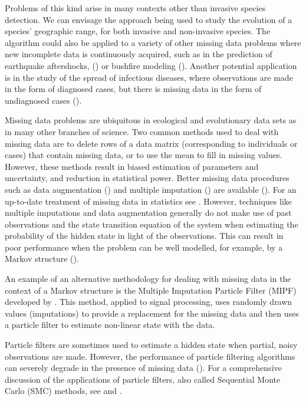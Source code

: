 Problems of this kind arise in many contexts other than invasive species detection. We can envisage the approach being used to study the evolution of a species' geographic range, for both invasive and non-invasive species. The algorithm could also be applied to a variety of other missing data problems where new incomplete data is continuously acquired, such as in the prediction of earthquake aftershocks, (\cite{Seif}) or bushfire modeling (\cite{Beer}). Another potential application is in the study of the spread of infectious diseases, where observations are made in the form of diagnosed cases, but there is missing data in the form of undiagnosed cases (\cite{O'Neill}). 

Missing data problems are ubiquitous in ecological and evolutionary data sets as in many other branches of science. Two common methods used to deal with missing data are to delete rows of a data matrix (corresponding to individuals or cases) that contain missing data, or to use the mean to fill in missing values. However, these methods result in biased estimation of parameters and uncertainty, and reduction in statistical power. Better missing data procedures such as data augmentation (\cite{Tanner}) and multiple imputation (\cite{RubinMI}) are available  (\cite{Nakagawa}).
For an up-to-date treatment of missing data in statistics see \cite{Little}.
However, techniques like multiple imputations and data augmentation generally do not make use of past observations and the state transition equation of the system when estimating the probability of the hidden state in light of the observations. This can result in poor performance when the problem can be well modelled, for example, by a Markov structure (\cite{Zhang}).

An example of an alternative methodology for dealing with missing data in the context of a Markov structure is the Multiple Imputation Particle Filter (MIPF) developed by \cite{Zhang}. This method, applied to signal processing, uses randomly drawn values (imputations) to provide a replacement for the missing data and then uses a particle filter to estimate non-linear state with the data.

Particle filters are sometimes used to estimate a hidden state when partial, noisy observations are made. However, the performance of particle filtering algorithms can severely degrade in the presence of missing data (\cite{Zhang}). For a comprehensive discussion of the applications of particle filters, also called Sequential Monte Carlo (SMC) methods, see \cite{Cappe} and \cite{Doucet}.


